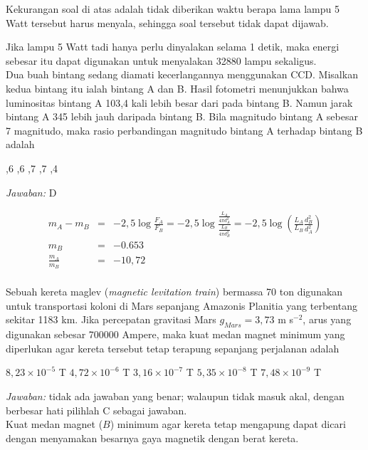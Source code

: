 \documentclass[11pt,fleqn]{exam}
\begin{document}
\begin{questions}
Kekurangan soal di atas adalah tidak diberikan waktu berapa lama lampu 5 Watt tersebut harus menyala, sehingga soal tersebut tidak dapat dijawab. 

Jika lampu 5 Watt tadi hanya perlu dinyalakan selama 1 detik, maka energi sebesar itu dapat digunakan untuk menyalakan 32880 lampu sekaligus.\\

\question Dua buah bintang sedang diamati kecerlangannya menggunakan CCD. Misalkan kedua bintang itu ialah bintang A dan B. Hasil fotometri menunjukkan bahwa luminositas bintang A 103,4 kali lebih besar dari pada bintang B. Namun jarak bintang A 345 lebih jauh daripada bintang B. Bila magnitudo bintang A sebesar 7 magnitudo, maka rasio perbandingan magnitudo bintang A terhadap bintang B adalah
\begin{choices}
,6
,6
,7
,7
,4
\end{choices}

\textit{Jawaban: } D

\begin{eqnarray*}
m_A - m_B &=& -2,5 \log{\frac{F_A}{F_B}} = -2,5 \log{\frac{\frac{L_A}{4\pi d_A^2}}{\frac{L_B}{4 \pi d_B^2}}} = -2,5 \log{\left(\frac{L_A}{L_B} \frac{d_B^2}{d_A^2}\right)}\\
m_B &=& -0.653\\
\frac{m_A}{m_B} &=& -10,72\\ 
\end{eqnarray*}


\question Sebuah kereta maglev (\textit{magnetic levitation train}) bermassa 70 ton digunakan untuk transportasi koloni di Mars sepanjang Amazonis Planitia yang terbentang sekitar 1183 km. Jika percepatan gravitasi Mars $g_{Mars} = 3,73$ m s$^{-2}$, arus yang digunakan sebesar 700000 Ampere, maka kuat medan magnet minimum yang diperlukan agar kereta tersebut tetap terapung sepanjang perjalanan adalah
\begin{choices}
\choice $8,23 \times 10^{-5}$ T
\choice $4,72 \times 10^{-6}$ T
\choice $3,16 \times 10^{-7}$ T
\choice $5,35 \times 10^{-8}$ T
\choice $7,48 \times 10^{-9}$ T
\end{choices}

\textit{Jawaban: } tidak ada jawaban yang benar; walaupun tidak masuk akal, dengan berbesar hati pilihlah C sebagai jawaban.\\

Kuat medan magnet ($B$) minimum agar kereta tetap mengapung dapat dicari dengan menyamakan besarnya gaya magnetik dengan berat kereta.


\end{questions}
\end{document}
